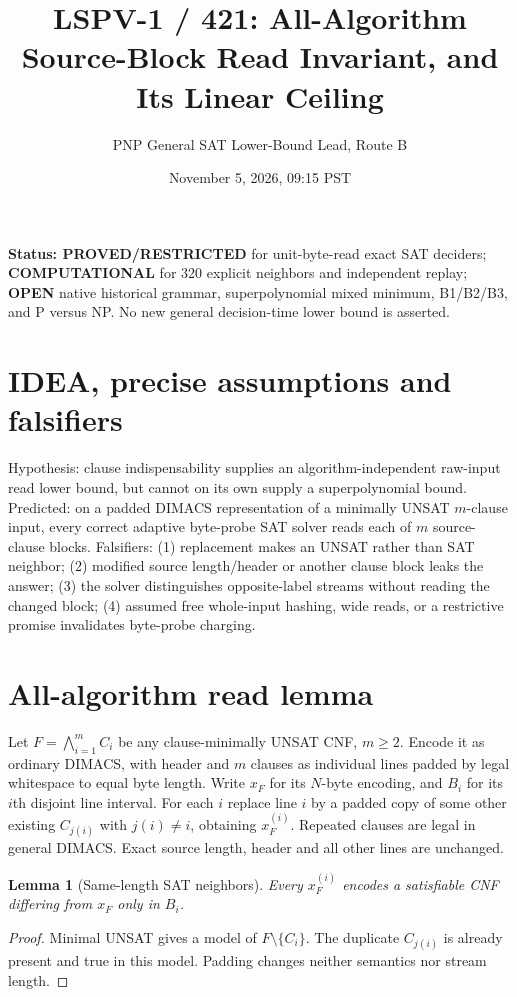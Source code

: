 \documentclass[11pt]{article}
\title{LSPV-1 / 421: All-Algorithm Source-Block Read Invariant, and Its Linear Ceiling}
\author{PNP General SAT Lower-Bound Lead, Route B}
\date{November 5, 2026, 09:15 PST}
\newtheorem{lemma}{Lemma}
\begin{document}
\maketitle
\noindent\textbf{Status: PROVED/RESTRICTED} for unit-byte-read exact SAT deciders; \textbf{COMPUTATIONAL} for 320 explicit neighbors and independent replay; \textbf{OPEN} native historical grammar, superpolynomial mixed minimum, B1/B2/B3, and P versus NP. No new general decision-time lower bound is asserted.

\section*{IDEA, precise assumptions and falsifiers}
Hypothesis: clause indispensability supplies an algorithm-independent raw-input read lower bound, but cannot on its own supply a superpolynomial bound. Predicted: on a padded DIMACS representation of a minimally UNSAT $m$-clause input, every correct adaptive byte-probe SAT solver reads each of $m$ source-clause blocks. Falsifiers: (1) replacement makes an UNSAT rather than SAT neighbor; (2) modified source length/header or another clause block leaks the answer; (3) the solver distinguishes opposite-label streams without reading the changed block; (4) assumed free whole-input hashing, wide reads, or a restrictive promise invalidates byte-probe charging.

\section*{All-algorithm read lemma}
Let $F=\bigwedge_{i=1}^m C_i$ be any clause-minimally UNSAT CNF, $m\ge2$. Encode it as ordinary DIMACS, with header and $m$ clauses as individual lines padded by legal whitespace to equal byte length. Write $x_F$ for its $N$-byte encoding, and $B_i$ for its $i$th disjoint line interval. For each $i$ replace line $i$ by a padded copy of some other existing $C_{j(i)}$ with $j(i)\ne i$, obtaining $x_F^{(i)}$. Repeated clauses are legal in general DIMACS. Exact source length, header and all other lines are unchanged.

\begin{lemma}[Same-length SAT neighbors]
Every $x_F^{(i)}$ encodes a satisfiable CNF differing from $x_F$ only in $B_i$.
\end{lemma}
\begin{proof}
Minimal UNSAT gives a model of $F\setminus\{C_i\}$. The duplicate $C_{j(i)}$ is already present and true in this model. Padding changes neither semantics nor stream length.
\end{proof}
\end{document}
